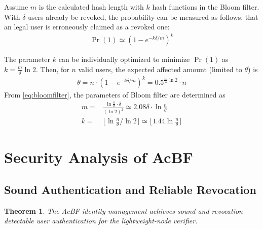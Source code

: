 \documentclass[conference]{IEEEtran}
\newtheorem{theorem}{Theorem}
\begin{document}
Assume $m$ is the calculated hash length with $k$ hash functions in the Bloom filter. With $\delta$ users already be revoked, the probability can be measured as follows, that an legal user is erroneously claimed as a revoked one: 
\begin{align} 
    \Pr(1) \simeq (1 - e^{-k\delta/m})^k 
 \end{align}

The parameter $k$ can be individually optimized to minimize $\Pr(1)$ as $ k = \frac{m}{\delta}\ln 2$. Then, for $n$ valid users, the expected affected amount (limited to $\theta$) is 
\begin{align}\label{eq:bloomfilter}
    \theta = n \cdot (1 - e^{-k\delta/m})^{k} = 0.5^{\frac{m}{\delta}\ln 2}\cdot n
\end{align}
From \eqref{eq:bloomfilter}, the parameters of Bloom filter are determined as 
\begin{align}
m = & \frac{\ln \frac{n}{\theta} \cdot \delta}{(\ln 2)^2} \simeq 2.08\delta \cdot\ln \frac{n}{\theta}\\
k = & \lfloor \ln \frac{n}{\theta} / \ln 2 \rceil \simeq \lfloor 1.44 \ln \frac{n}{\theta} \rceil
\end{align}


\section{Security Analysis of AcBF}\label{sec:security}
\subsection{Sound Authentication and Reliable Revocation}
\begin{theorem}\label{theo:security}
	The AcBF identity management achieves sound and revocation-detectable user authentication for the lightweight-node verifier.
\end{theorem}
\end{document}
